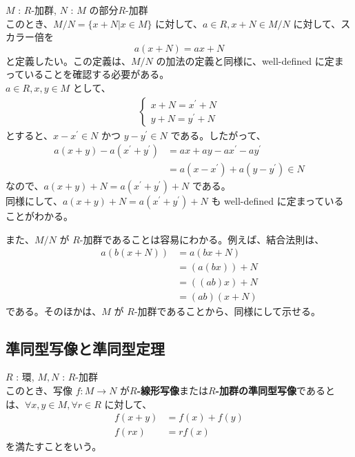 \documentclass[article,paper=a4paper]{jlreq}
\begin{document}
\begin{rem}
  $M$ : $R$-\hspace{0pt}加群, $N$ : $M$ の部分$R$-\hspace{0pt}加群\\
  このとき、$M/N = \{x+N | x\in M\}$ に対して、$a\in R, x+N\in M/N$ に対して、スカラー倍を
  \[a(x+N) = ax + N\]
  と定義したい。この定義は、$M/N$ の加法の定義と同様に、well-defined に定まっていることを確認する必要がある。\\
  $a\in R, x, y \in M$ として、
  \begin{align*}
    \begin{cases}
      x+N = x^{\prime}+N \\
      y+N = y^{\prime}+N
    \end{cases}
  \end{align*}
  とすると、$x - x^{\prime} \in N$ かつ $y - y^{\prime} \in N$ である。したがって、 
  \begin{align*}
    a(x+y) - a(x^{\prime} + y^{\prime}) &= ax + ay - ax^{\prime} - ay^{\prime} \\
    &= a(x - x^{\prime}) + a(y - y^{\prime}) \in N
  \end{align*}
  なので、$a(x+y) + N = a(x^{\prime} + y^{\prime}) + N$ である。\\
  \quad 同様にして、$a(x+y) + N = a(x^{\prime} + y^{\prime}) + N$ も well-defined に定まっていることがわかる。

  また、$M/N$ が $R$-\hspace{0pt}加群であることは容易にわかる。例えば、結合法則は、
  \begin{align*}
    a(b(x+N)) &= a(bx + N) \\
    &= (a(bx)) + N \\
    &= ((ab)x) + N \\
    &= (ab)(x+N)
  \end{align*}
  である。そのほかは、$M$ が $R$-\hspace{0pt}加群であることから、同様にして示せる。
\end{rem}

\subsection{準同型写像と準同型定理}

\begin{dfn}
  \quad $R$ : 環, $M, N$ : $R$-加群\\
  このとき、写像 $f \colon M \to N$ が$R$\textbf{-\hspace{0pt}線形写像}または$R$\textbf{-\hspace{0pt}加群の準同型写像}であるとは、$\forall x, y \in M, \forall r \in R$ に対して、
  \begin{align*}
    f(x+y) &= f(x) + f(y) \\
    f(rx) &= rf(x)
  \end{align*}
  を満たすことをいう。
\end{dfn}
\end{document}
